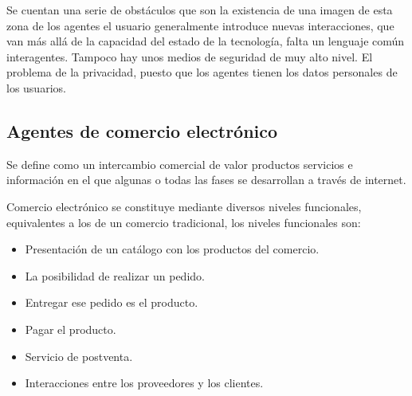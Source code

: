 \documentclass[12pt, twoside, openright]{report} %
\begin{document}
Se cuentan una serie de obstáculos que son la existencia de una imagen de esta zona de los agentes el usuario generalmente introduce nuevas interacciones, que van más allá de la capacidad del estado de la tecnología, falta un lenguaje común interagentes. Tampoco hay unos medios de seguridad de muy alto nivel. El problema de la privacidad, puesto que los agentes tienen los datos personales de los usuarios.

\subsection{Agentes de comercio electrónico}
Se define como un intercambio comercial de valor productos servicios e información en el que algunas o todas las fases se desarrollan a través de internet. 

Comercio electrónico se constituye mediante diversos niveles funcionales, equivalentes a los de un comercio tradicional, los niveles funcionales son:
\begin{itemize}
	\item Presentación de un catálogo con los productos del comercio.
	\item La posibilidad de realizar un pedido.
	\item Entregar ese pedido es el producto.
	\item Pagar el producto.
	\item Servicio de postventa.
	\item Interacciones entre los proveedores y los clientes.
\end{itemize}
\end{document}
